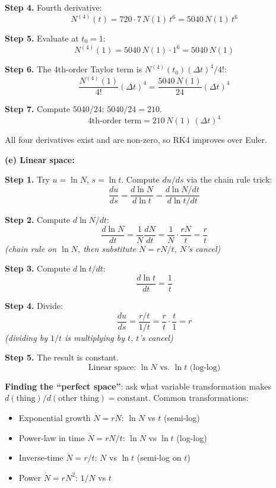 \documentclass[10pt]{article}
\newcommand{\stepwhy}[1]{\textcolor{blue!60!black}{\small\textit{(#1)}}}
\begin{document}
\begin{solution}
\textbf{Step 4.} Fourth derivative:
\[
N^{(4)}(t) = 720\cdot 7\,N(1)\,t^6 = 5040\,N(1)\,t^6
\]

\textbf{Step 5.} Evaluate at $t_0 = 1$:
\[
N^{(4)}(1) = 5040\,N(1)\cdot 1^6 = 5040\,N(1)
\]

\textbf{Step 6.} The 4th-order Taylor term is $N^{(4)}(t_0)(\Delta t)^4/4!$:
\[
\frac{N^{(4)}(1)}{4!}(\Delta t)^4 = \frac{5040\,N(1)}{24}(\Delta t)^4
\]

\textbf{Step 7.} Compute $5040/24$: $5040/24 = 210$.
\[
\boxed{\text{4th-order term} = 210\,N(1)\,(\Delta t)^4}
\]

All four derivatives exist and are non-zero, so RK4 improves over Euler.

\medskip\textbf{(e) Linear space:}

\textbf{Step 1.} Try $u = \ln N$, $s = \ln t$. Compute $du/ds$ via the chain rule trick:
\[
\frac{du}{ds} = \frac{d\ln N}{d\ln t} = \frac{d\ln N/dt}{d\ln t/dt}
\]

\textbf{Step 2.} Compute $d\ln N/dt$:
\[
\frac{d\ln N}{dt} = \frac{1}{N}\frac{dN}{dt} = \frac{1}{N}\cdot\frac{rN}{t} = \frac{r}{t}
\]
\stepwhy{chain rule on $\ln N$, then substitute $\dot N = rN/t$, $N$'s cancel}

\textbf{Step 3.} Compute $d\ln t/dt$:
\[
\frac{d\ln t}{dt} = \frac{1}{t}
\]

\textbf{Step 4.} Divide:
\[
\frac{du}{ds} = \frac{r/t}{1/t} = \frac{r}{t}\cdot\frac{t}{1} = r
\]
\stepwhy{dividing by $1/t$ is multiplying by $t$, $t$'s cancel}

\textbf{Step 5.} The result is constant.
\[
\boxed{\text{Linear space: } \ln N \text{ vs.\ } \ln t \text{ (log-log)}}
\]
\end{solution}

\begin{keyidea}
\textbf{Finding the ``perfect space''}: ask what variable transformation makes $d(\text{thing})/d(\text{other thing}) = \text{constant}$. Common transformations:
\begin{itemize}
\item Exponential growth $\dot N = rN$: $\ln N$ vs $t$ (semi-log)
\item Power-law in time $\dot N = rN/t$: $\ln N$ vs $\ln t$ (log-log)
\item Inverse-time $\dot N = r/t$: $N$ vs $\ln t$ (semi-log on $t$)
\item Power $\dot N = rN^2$: $1/N$ vs $t$
\end{itemize}
\end{keyidea}
\end{document}
